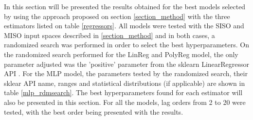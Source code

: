 \documentclass[conference]{IEEEtran}
\begin{document}
In this section will be presented the results obtained for the best models selected by using the approach proposed on section \ref{section_method} with the three estimators listed on table \ref{regressors}. All models were tested with the SISO and MISO input spaces described in \ref{section_method} and in both cases, a randomized search was performed in order to select the best hyperparameters. On the randomized search performed for the LinReg and PolyReg model, the only parameter adjusted was the 'positive' parameter from the sklearn LinearRegressor API \cite{sklearn_manual}. For the MLP model, the parameters tested by the randomized search, their sklear API name, ranges and statistical distributions (if applicable) are shown in table \ref{mlp_rdmsearch}. The best hyperparameters found for each estimator will also be presented in this section. For all the models, lag orders from 2 to 20 were tested, with the best order being presented with the results.
\end{document}
